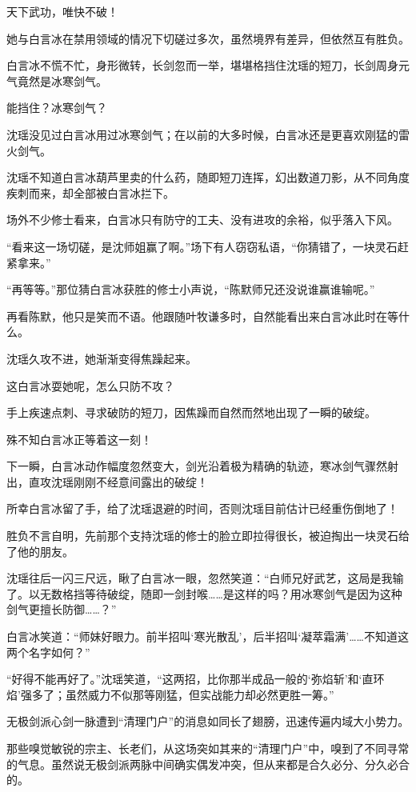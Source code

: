 天下武功，唯快不破！

她与白言冰在禁用领域的情况下切磋过多次，虽然境界有差异，但依然互有胜负。

白言冰不慌不忙，身形微转，长剑忽而一举，堪堪格挡住沈瑶的短刀，长剑周身元气竟然是冰寒剑气。

能挡住？冰寒剑气？

沈瑶没见过白言冰用过冰寒剑气；在以前的大多时候，白言冰还是更喜欢刚猛的雷火剑气。

沈瑶不知道白言冰葫芦里卖的什么药，随即短刀连挥，幻出数道刀影，从不同角度疾刺而来，却全部被白言冰拦下。

场外不少修士看来，白言冰只有防守的工夫、没有进攻的余裕，似乎落入下风。

“看来这一场切磋，是沈师姐赢了啊。”场下有人窃窃私语，“你猜错了，一块灵石赶紧拿来。”

“再等等。”那位猜白言冰获胜的修士小声说，“陈默师兄还没说谁赢谁输呢。”

再看陈默，他只是笑而不语。他跟随叶牧谦多时，自然能看出来白言冰此时在等什么。

沈瑶久攻不进，她渐渐变得焦躁起来。

这白言冰耍她呢，怎么只防不攻？

手上疾速点刺、寻求破防的短刀，因焦躁而自然而然地出现了一瞬的破绽。

殊不知白言冰正等着这一刻！

下一瞬，白言冰动作幅度忽然变大，剑光沿着极为精确的轨迹，寒冰剑气骤然射出，直攻沈瑶刚刚不经意间露出的破绽！

所幸白言冰留了手，给了沈瑶退避的时间，否则沈瑶目前估计已经重伤倒地了！

胜负不言自明，先前那个支持沈瑶的修士的脸立即拉得很长，被迫掏出一块灵石给了他的朋友。

沈瑶往后一闪三尺远，瞅了白言冰一眼，忽然笑道：“白师兄好武艺，这局是我输了。以无数格挡等待破绽，随即一剑封喉……是这样的吗？用冰寒剑气是因为这种剑气更擅长防御……？”

白言冰笑道：“师妹好眼力。前半招叫‘寒光散乱’，后半招叫‘凝萃霜满’……不知道这两个名字如何？”

“好得不能再好了。”沈瑶笑道，“这两招，比你那半成品一般的‘弥焰斩’和‘直环焰’强多了；虽然威力不似那等刚猛，但实战能力却必然更胜一筹。”

\vspace{2em}

无极剑派心剑一脉遭到“清理门户”的消息如同长了翅膀，迅速传遍内域大小势力。

那些嗅觉敏锐的宗主、长老们，从这场突如其来的“清理门户”中，嗅到了不同寻常的气息。虽然说无极剑派两脉中间确实偶发冲突，但从来都是合久必分、分久必合的。

